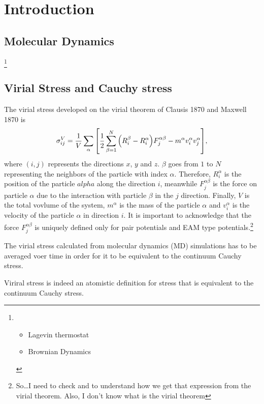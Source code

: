 \documentclass[../../main-notes.tex]{subfiles}
\begin{document}
\section{Introduction}

\subsection{Molecular Dynamics}\footnote{\begin{itemize}\item Lagevin thermostat \item Brownian Dynamics\end{itemize}}

\subsection{Virial Stress and Cauchy stress}


The virial stress developed on the virial theorem of Clausis 1870 and Maxwell 1870 is 
\begin{gather}
    \sigma_{ij}^V = \frac{1}{V}\sum_\alpha\qty[\frac{1}{2}\sum_{\beta=1}^N\qty(R_i^\beta-R^\alpha_i)F^{\alpha\beta}_j-m^\alpha v_i^\alpha v_j^\alpha]\label{eqn-mdStress},
\end{gather}
where $(i,j)$ represents the directions $x$, $y$ and $z$.
$\beta$ goes from $1$ to $N$ representing the neighbors of the particle with index $\alpha$.
Therefore, $R^\alpha_i$ is the position of the particle $alpha$ along the direction $i$, meanwhile $F^{\alpha\beta}_j$ is the force on particle $\alpha$ due to the interaction with particle $\beta$ in the $j$ direction.
Finally, $V$ is the total vovlume of the system, $m^\alpha$ is the mass of the particle $\alpha$ and $v^\alpha_i$ is the velocity of the particle $\alpha$ in direction $i$.
It is important to acknowledge that the force $F^{\alpha\beta}_j$ is uniquely defined only for pair potentials and EAM type potentials.\footnote{So\ldots I need to check\citep{Swenson_1983} and\citep{Tsai_1979} to understand how we get that expression from the virial theorem. Also, I don't know what is the virial theorem  }


The virial stress calculated from molecular dynamics (MD) simulations has to be averaged voer time in order for it to be equivalent to the continuum Cauchy stress\citep{Subramaniyan_Sun_2008}.

Viriral stress is indeed an atomistic definition for stress that is equivalent to the continuum Cauchy stress.
\end{document}
